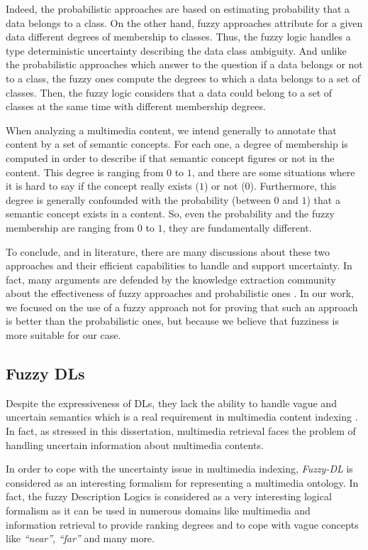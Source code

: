 		Indeed, the probabilistic approaches are based on estimating probability that 
		a data belongs to a class. On the other hand, fuzzy approaches attribute for 
		a given data different degrees of membership to classes. Thus, the fuzzy logic 
		handles a type deterministic uncertainty describing the data class ambiguity. 
		And unlike the probabilistic approaches which answer to the question if a data 
		belongs or not to a class, the fuzzy ones compute the degrees to which a data 
		belongs to a set of classes. Then, the fuzzy logic considers that a data could 
		belong to a set of classes at the same time with different membership degrees.  
	
		When analyzing a multimedia content, we intend generally to annotate that content by 
		a set of semantic concepts. For each one, a degree of membership is computed in 
		order to describe if that semantic concept figures or not in the content. 
		This degree is ranging from $0$ to $1$, and there are some situations where 
		it is hard to say if the concept really exists ($1$) or not ($0$). Furthermore, 
		this degree is generally confounded with the probability (between $0$ and $1$) 
		that a semantic concept exists in a content. So, even the probability and 
		the fuzzy membership are ranging from $0$ to $1$, they are fundamentally
		different.

		To conclude, and in literature, there are many discussions about these 
		two approaches and their efficient capabilities to handle and support uncertainty. 
		In fact, many arguments are defended by the knowledge extraction community about 
		the effectiveness of fuzzy approaches and probabilistic ones 
		\citep{Gaines1978,Bosko1990,Sanjaa2007,Zadeh2014,Zadeh2015}. In our work, we focused on the use of a
		fuzzy approach not for proving that such an approach is better than the probabilistic ones, 
		but because we believe that fuzziness 
		is more suitable for our case.

		\subsection{Fuzzy DLs}
		Despite the expressiveness of DLs, they lack the ability to handle vague and uncertain semantics 
		which is a real requirement in multimedia content indexing \citep{Simou2008}.  In fact, as stressed 
		in this dissertation, multimedia retrieval faces the problem of handling uncertain information 
		about multimedia contents.

		In order to cope with the uncertainty issue in multimedia indexing,  \emph{Fuzzy-DL} 
		\citep{Stracci1998,Straccia2006,Stoilos2007,Ma2013} is considered as an interesting 
		formalism for representing a multimedia ontology. In fact, the fuzzy Description Logics
		is considered as a very interesting logical formalism as it can be used in numerous domains
		like multimedia and information retrieval \citep{Meghini2001} to provide ranking degrees and 
		to cope with vague concepts like \emph{“near”}, \emph{“far”} and many more.

